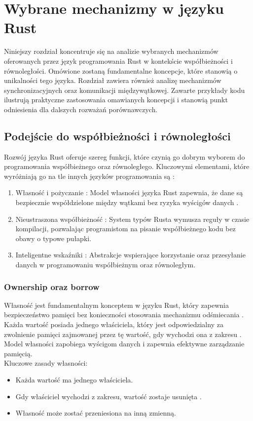 \chapter{Wybrane mechanizmy w języku Rust}
Niniejszy rozdział koncentruje się na analizie wybranych mechanizmów oferowanych przez język programowania Rust w kontekście współbieżności i równoległości. Omówione zostaną fundamentalne koncepcje, które stanowią o unikalności tego języka. Rozdział zawiera również analizę mechanizmów synchronizacyjnych oraz komunikacji międzywątkowej. Zawarte przykłady kodu ilustrują praktyczne zastosowania omawianych koncepcji i stanowią punkt odniesienia dla dalszych rozważań porównawczych.
\section{Podejście do współbieżności i równoległości}

Rozwój języka Rust oferuje szereg funkcji, które czynią go dobrym wyborem do programowania współbieżnego oraz równoległego. Kluczowymi elementami, które wyróżniają go na tle innych języków programowania są \cite{rustPolishNames}:
\begin{enumerate}
    \item Własność  i pożyczanie : Model własności języka Rust zapewnia, że dane są bezpiecznie współdzielone między wątkami bez ryzyka wyścigów danych .
    \item Nieustraszona współbieżność : System typów Rusta wymusza reguły w czasie kompilacji, pozwalając programistom na pisanie współbieżnego kodu bez obawy o typowe pułapki.
    \item Inteligentne wskaźniki : Abstrakcje wspierające korzystanie oraz przesyłanie danych w programowaniu współbieżnym oraz równoległym.
\end{enumerate}

\subsection{Ownership oraz borrow}
\label{ownership_borrow}
Własność  jest fundamentalnym konceptem w języku Rust, który zapewnia bezpieczeństwo pamięci bez konieczności stosowania mechanizmu odśmiecania . Każda wartość posiada jednego właściciela, który jest odpowiedzialny za zwolnienie pamięci zajmowanej przez tę wartość, gdy wychodzi ona z zakresu . Model własności zapobiega wyścigom danych i zapewnia efektywne zarządzanie pamięcią.\\
Kluczowe zasady własności:
\begin{itemize}
    \item Każda wartość ma jednego właściciela.
    \item Gdy właściciel wychodzi z zakresu, wartość zostaje usunięta .
    \item Własność może zostać przeniesiona  na inną zmienną.
\end{itemize}

